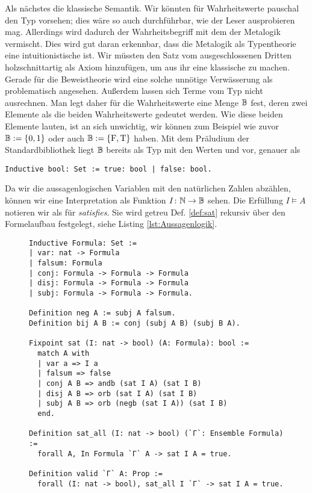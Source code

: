 Als nächstes die klassische Semantik. Wir könnten für Wahrheitswerte
pauschal den Typ  vorsehen; dies wäre so auch durchführbar, wie
der Leser ausprobieren mag. Allerdings wird dadurch der Wahrheitsbegriff
mit dem der Metalogik vermischt. Dies wird gut daran erkennbar, dass die
Metalogik als Typentheorie eine intuitionistische ist. Wir müssten
den Satz vom ausgeschlossenen Dritten holzschnittartig als Axiom hinzufügen,
um aus ihr eine klassische zu machen. Gerade für die Beweistheorie wird
eine solche unnötige Verwässerung als problematisch angesehen. Außerdem lassen
sich Terme vom Typ  nicht ausrechnen. Man legt daher für die
Wahrheitswerte eine Menge $\mathbb B$ fest, deren zwei Elemente als die beiden
Wahrheitswerte gedeutet werden. Wie diese beiden Elemente lauten, ist
an sich unwichtig, wir können zum Beispiel wie zuvor $\mathbb B:=\{0,1\}$ oder auch
$\mathbb B:=\{\mathrm F,\mathrm T\}$ haben. Mit dem Präludium der Standardbibliothek
liegt $\mathbb B$ bereits als Typ  mit den Werten 
und  vor, genauer als
\begin{lstlisting}[language=Coq, xleftmargin=\mathindent]
Inductive bool: Set := true: bool | false: bool.
\end{lstlisting}
Da wir die aussagenlogischen Variablen mit den natürlichen Zahlen abzählen,
können wir eine Interpretation als Funktion $I\colon\mathbb N\to\mathbb B$ sehen.
Die Erfüllung $I\models A$ notieren wir als  für
\emph{satisfies}. Sie wird getreu Def. \ref{def:sat} rekursiv über den
Formelaufbau festgelegt, siehe Listing \ref{lst:Aussagenlogik}.

\begin{figure}[t]
\begin{lstlisting}[language=Coq, xleftmargin=\mathindent, escapechar=`,
label=lst:Aussagenlogik, caption={Die aussagenlogische Sprache und ihre
klassische Semantik}]
Inductive Formula: Set :=
| var: nat -> Formula
| falsum: Formula
| conj: Formula -> Formula -> Formula
| disj: Formula -> Formula -> Formula
| subj: Formula -> Formula -> Formula.

Definition neg A := subj A falsum.
Definition bij A B := conj (subj A B) (subj B A).

Fixpoint sat (I: nat -> bool) (A: Formula): bool :=
  match A with
  | var a => I a
  | falsum => false
  | conj A B => andb (sat I A) (sat I B)
  | disj A B => orb (sat I A) (sat I B)
  | subj A B => orb (negb (sat I A)) (sat I B)
  end.

Definition sat_all (I: nat -> bool) (`Γ`: Ensemble Formula) :=
  forall A, In Formula `Γ` A -> sat I A = true.

Definition valid `Γ` A: Prop :=
  forall (I: nat -> bool), sat_all I `Γ` -> sat I A = true.
\end{lstlisting}
\end{figure}

